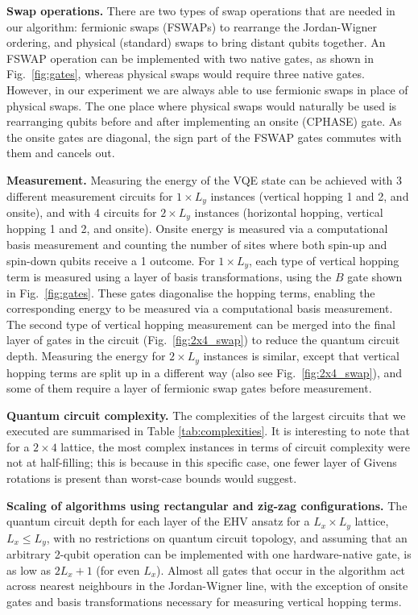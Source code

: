 \documentclass[aps,prb,twoside,superscriptaddress,longbibliography,nofootinbib,floatfix, notitlepage,twocolumn]{revtex4-1}
\begin{document}
\textbf{Swap operations.} There are two types of swap operations that are needed in our algorithm: fermionic swaps (FSWAPs) to rearrange the Jordan-Wigner ordering, and physical (standard) swaps to bring distant qubits together. An FSWAP operation can be implemented with two native gates, as shown in Fig.~\ref{fig:gates}, whereas physical swaps would require three native gates. However, in our experiment we are always able to use fermionic swaps in place of physical swaps. The one place where physical swaps would naturally be used is rearranging qubits before and after implementing an onsite (CPHASE) gate. As the onsite gates are diagonal, the sign part of the FSWAP gates commutes with them and cancels out.

\textbf{Measurement.} Measuring the energy of the VQE state can be achieved with 3 different measurement circuits for $1 \times L_y$ instances (vertical hopping 1 and 2, and onsite), and with 4 circuits for $2\times L_y$ instances (horizontal hopping, vertical hopping 1 and 2, and onsite). Onsite energy is measured via a computational basis measurement and counting the number of sites where both spin-up and spin-down qubits receive a 1 outcome. For $1 \times L_y$, each type of vertical hopping term is measured using a layer of basis transformations, using the $B$ gate shown in Fig.\ \ref{fig:gates}. These gates diagonalise the hopping terms, enabling the corresponding energy to be measured via a computational basis measurement. The second type of vertical hopping measurement can be merged into the final layer of gates in the circuit (Fig.\ \ref{fig:2x4_swap}) to reduce the quantum circuit depth. Measuring the energy for $2 \times L_y$ instances is similar, except that vertical hopping terms are split up in a different way (also see Fig.\ \ref{fig:2x4_swap}), and some of them require a layer of fermionic swap gates before measurement.

\textbf{Quantum circuit complexity.} The complexities of the largest circuits that we executed are summarised in Table \ref{tab:complexities}. It is interesting to note that for a $2\times 4$ lattice, the most complex instances in terms of circuit complexity were not at half-filling; this is because in this specific case, one fewer layer of Givens rotations is present than worst-case bounds would suggest\cite{jiang2018quantum}.

\textbf{Scaling of algorithms using rectangular and zig-zag configurations.} The quantum circuit depth for each layer of the EHV ansatz for a $L_x \times L_y$ lattice, $L_x \le L_y$, with no restrictions on quantum circuit topology\cite{cade20}, and assuming that an arbitrary 2-qubit operation can be implemented with one hardware-native gate, is as low as $2L_x+1$ (for even $L_x$). Almost all gates that occur in the algorithm act across nearest neighbours in the Jordan-Wigner line, with the exception of onsite gates and basis transformations necessary for measuring vertical hopping terms.
\end{document}
